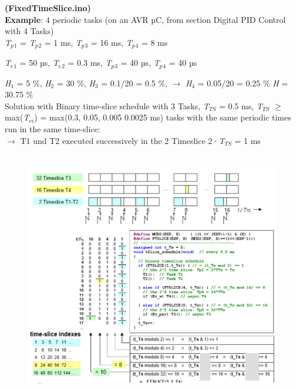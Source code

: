 \textbf{  (FixedTimeSlice.ino)}\\
\newpage
\textbf{Example}: 4 periodic tasks (on an AVR µC, from section Digital PID Control with 4 Tasks) \\

\textit{T${}_{p}$}${}_{1}$ = \textit{T${}_{p}$}${}_{2}$ = 1 ms, \textit{T${}_{p}$}${}_{3}$ = 16 ms, \textit{T${}_{p}$}${}_{4}$ = 8 ms

\textit{T${}_{e}$}${}_{1}$ = 50 µs, \textit{T${}_{e}$}${}_{2}$ = 0.3 ms, \textit{T${}_{p}$}${}_{3}$ = 40 µs, \textit{T${}_{p}$}${}_{4}$ = 40 µs

\textit{H}${}_{1}$ = 5 \%, \textit{H}${}_{2}$ = 30 \%, \textit{H}${}_{3}$ = 0.1/20 = 0.5 \%, $\rightarrow$ \textit{H}${}_{4}$ = 0.05/20 = 0.25 \%  \textit{H} = 30.75 \%\\

Solution with Binary time-slice schedule with 3 Tasks, \textit{T${}_{TS}$} = 0.5 ms, \textit{T${}_{TS}$} $\mathrm{\ge}$ max(\textit{T${}_{ei}$}) = max(0.3, 0.05, 0.005 0.0025 ms) tasks with the same periodic times run in the same time-slice:\\
 $\rightarrow$ T1 und T2 executed successively in the 2 Timeslice 2·\textit{T${}_{TS}$ }= 1 ms\\
 
 
 	\begin{figure}[h]
    \centering
    \includegraphics[width=15cm, height=11cm]{Images/image96.png}
    \label{fig:Fig }
    \end{figure}

